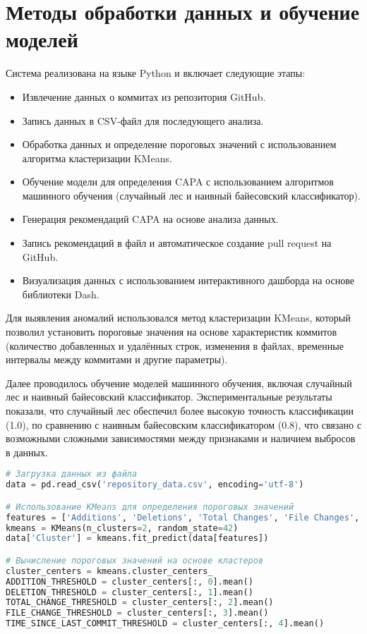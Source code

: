 \section{Методы обработки данных и обучение моделей} \label{ch3:sec2}

Система реализована на языке Python и включает следующие этапы:
\begin{itemize}
	\item Извлечение данных о коммитах из репозитория GitHub.
	\item Запись данных в CSV-файл для последующего анализа.
	\item Обработка данных и определение пороговых значений с использованием алгоритма кластеризации KMeans.
	\item Обучение модели для определения CAPA с использованием алгоритмов машинного обучения (случайный лес и наивный байесовский классификатор).
	\item Генерация рекомендаций CAPA на основе анализа данных.
	\item Запись рекомендаций в файл и автоматическое создание pull request на GitHub.
	\item Визуализация данных с использованием интерактивного дашборда на основе библиотеки Dash.
\end{itemize}

Для выявления аномалий использовался метод кластеризации KMeans, который позволил установить пороговые значения на основе характеристик коммитов (количество добавленных и удалённых строк, изменения в файлах, временные интервалы между коммитами и другие параметры). 

Далее проводилось обучение моделей машинного обучения, включая случайный лес и наивный байесовский классификатор. Экспериментальные результаты показали, что случайный лес обеспечил более высокую точность классификации (1.0), по сравнению с наивным байесовским классификатором (0.8), что связано с возможными сложными зависимостями между признаками и наличием выбросов в данных.

\begin{lstlisting}[language=Python]
# Загрузка данных из файла
data = pd.read_csv('repository_data.csv', encoding='utf-8')

# Использование KMeans для определения пороговых значений
features = ['Additions', 'Deletions', 'Total Changes', 'File Changes', 'Time Since Last Commit']
kmeans = KMeans(n_clusters=2, random_state=42)
data['Cluster'] = kmeans.fit_predict(data[features])

# Вычисление пороговых значений на основе кластеров
cluster_centers = kmeans.cluster_centers_
ADDITION_THRESHOLD = cluster_centers[:, 0].mean()
DELETION_THRESHOLD = cluster_centers[:, 1].mean()
TOTAL_CHANGE_THRESHOLD = cluster_centers[:, 2].mean()
FILE_CHANGE_THRESHOLD = cluster_centers[:, 3].mean()
TIME_SINCE_LAST_COMMIT_THRESHOLD = cluster_centers[:, 4].mean()
\end{lstlisting}

